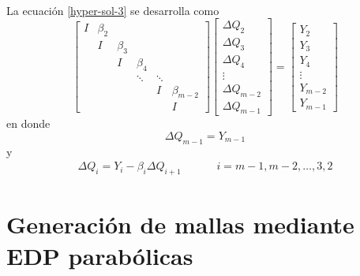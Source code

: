\documentclass[letterpaper, openright, 12pt]{book}
\begin{document}
	\paragraph*{}
		La ecuación \ref{hyper-sol-3} se desarrolla como
		\begin{equation}
			\begin{bmatrix}
				I & \beta_2\\
				& I & \beta_3\\
				& & I & \beta_4\\
				& & & \ddots & \ddots\\
				& & & & I & \beta_{m-2}\\
				& & & & & I
			\end{bmatrix}
			\begin{bmatrix}
				\Delta Q_2\\
				\Delta Q_3\\
				\Delta Q_4\\
				\vdots\\
				\Delta Q_{m-2}\\
				\Delta Q_{m-1}
			\end{bmatrix}
			=
			\begin{bmatrix}
				Y_2\\
				Y_3\\
				Y_4\\
				\vdots\\
				Y_{m-2}\\
				Y_{m-1}
			\end{bmatrix}
		\end{equation}
		en donde
		\begin{equation}
			\Delta Q_{m-1} = Y_{m-1}
		\end{equation}
		y
		\begin{align}
			\Delta Q_i = Y_i - \beta_i \Delta Q_{i+1} &&&& i = m-1, m-2, \dots, 3, 2
		\end{align}
		
		
	\section{Generación de mallas mediante EDP parabólicas}
\end{document}
